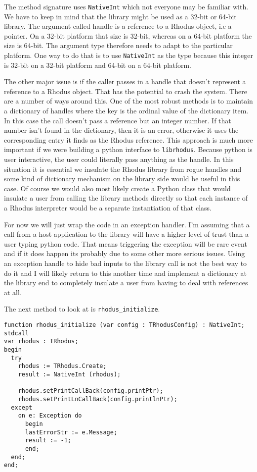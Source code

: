 The method signature uses {\tt NativeInt} which not everyone may be familiar with. We have to keep in mind that the library might be used as a 32-bit or 64-bit library. The argument called handle is a reference to a Rhodus object, i.e a pointer. On a 32-bit platform that size is 32-bit, whereas on a 64-bit platform the size is 64-bit. The argument type therefore needs to adapt to the particular platform. One way to do that is to use {\tt NativeInt} as the type because this integer is 32-bit on a 32-bit platform and 64-bit on a 64-bit platform.

The other major issue is if the caller passes in a handle that doesn't represent a reference to a Rhodus object. That has the potential to crash the system. There are a number of ways around this. One of the most robust methods is to maintain a dictionary of handles where the key is the ordinal value of the dictionary item. In this case the call doesn't pass a reference but an integer number. If that number isn't found in the dictionary, then it is an error, otherwise it uses the corresponding entry it finds as the Rhodus reference. This approach is much more important if we were building a python interface to {\tt librhodus}. Because python is user interactive, the user could literally pass anything as the handle. In this situation it is essential we insulate the Rhodus library from rogue handles and some kind of dictionary mechanism on the library side would be useful in this case. Of course we would also most likely create a Python class that would insulate a user from calling the library methods directly so that each instance of a Rhodus interpreter would be a separate instantiation of that class.

For now we will just wrap the code in an exception handler. I'm assuming that a call from a host application to the library will have a higher level of trust than a user typing python code. That means triggering the exception will be rare event and if it does happen its probably due to some other more serious issues.  Using an exception handle to hide bad inputs to the library call is not the best way to do it and I will likely return to this another time and implement a dictionary at the library end to completely insulate a user from having to deal with references at all.

The next method to look at is {\tt rhodus_initialize}.

\begin{lstlisting}
function rhodus_initialize (var config : TRhodusConfig) : NativeInt; stdcall
var rhodus : TRhodus;
begin
  try
    rhodus := TRhodus.Create;
    result := NativeInt (rhodus);

    rhodus.setPrintCallBack(config.printPtr);
    rhodus.setPrintLnCallBack(config.printlnPtr);
  except
    on e: Exception do
      begin
      lastErrorStr := e.Message;
      result := -1;
      end;
  end;
end;
\end{lstlisting}

